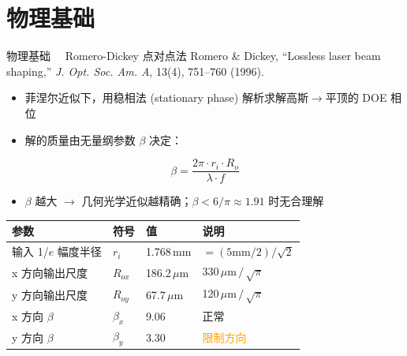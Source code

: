 \documentclass[10pt,aspectratio=43]{beamer}
\newcommand{\orange}[1]{\textcolor{orange}{#1}}
\begin{document}
\section{物理基础}

\begin{frame}{物理基础 \ \ Romero-Dickey 点对点法}
  {\scriptsize Romero \& Dickey, ``Lossless laser beam shaping,'' \textit{J. Opt. Soc. Am. A}, 13(4), 751--760 (1996).}

  \vspace{0.05cm}
  \begin{itemize}
    \item 菲涅尔近似下，用稳相法 (stationary phase) 解析求解高斯$\to$平顶的 DOE 相位
    \item 解的质量由无量纲参数 $\beta$ 决定：
  \end{itemize}
  \[
    \boxed{\;\beta = \frac{2\pi \cdot r_i \cdot R_o}{\lambda \cdot f}\;}
  \]
  \begin{itemize}
    \item $\beta$ 越大 $\to$ 几何光学近似越精确；$\beta<6/\pi\approx 1.91$ 时无合理解
  \end{itemize}

  \vspace{-0.1cm}
  \begin{table}
    \footnotesize
    \begin{tabular}{llll}
      \toprule
      \textbf{参数} & \textbf{符号} & \textbf{值} & \textbf{说明} \\
      \midrule
      输入 1/$e$ 幅度半径 & $r_i$ & 1.768\,mm & $=(\text{5mm}/2)/\sqrt{2}$ \\
      x 方向输出尺度 & $R_{ox}$ & 186.2\,$\mu$m & 330\,$\mu$m\,$/\,\sqrt{\pi}$ \\
      y 方向输出尺度 & $R_{oy}$ & 67.7\,$\mu$m & 120\,$\mu$m\,$/\,\sqrt{\pi}$ \\
      x 方向 $\beta$ & $\beta_x$ & 9.06 & 正常 \\
      y 方向 $\beta$ & $\beta_y$ & 3.30 & \orange{限制方向} \\
      \bottomrule
    \end{tabular}
  \end{table}
\end{frame}
\end{document}
